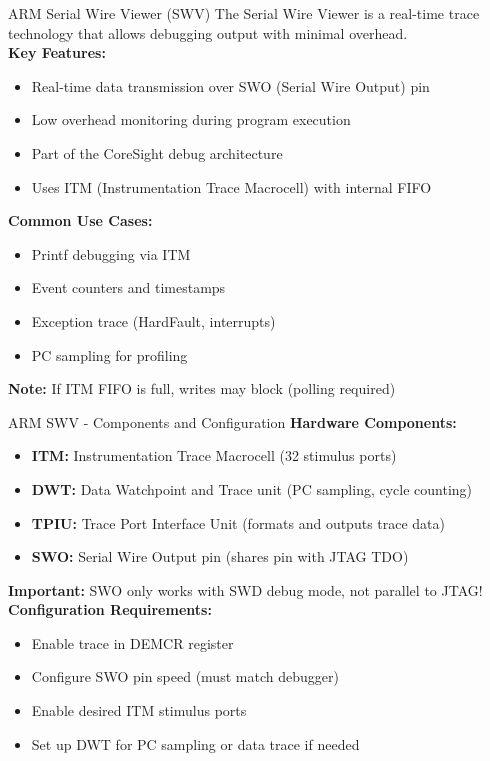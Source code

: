 \documentclass{beamer}
\begin{document}
\begin{frame}{ARM}
	{Serial Wire Viewer (SWV)}
	The Serial Wire Viewer is a real-time trace technology that allows debugging output with minimal overhead.\\
	\vspace{0.2cm}
	\textbf{Key Features:}
	\begin{itemize}
		\item Real-time data transmission over SWO (Serial Wire Output) pin
		\item Low overhead monitoring during program execution
		\item Part of the CoreSight debug architecture
		\item Uses ITM (Instrumentation Trace Macrocell) with internal FIFO
	\end{itemize}
	\vspace{0.2cm}
	\textbf{Common Use Cases:}
	\begin{itemize}
		\item Printf debugging via ITM
		\item Event counters and timestamps
		\item Exception trace (HardFault, interrupts)
		\item PC sampling for profiling
	\end{itemize}
	\vspace{0.2cm}
	\textbf{Note:} If ITM FIFO is full, writes may block (polling required)
\end{frame}

\begin{frame}{ARM}
	{SWV - Components and Configuration}
	\textbf{Hardware Components:}
	\begin{itemize}
		\item \textbf{ITM:} Instrumentation Trace Macrocell (32 stimulus ports)
		\item \textbf{DWT:} Data Watchpoint and Trace unit (PC sampling, cycle counting)
		\item \textbf{TPIU:} Trace Port Interface Unit (formats and outputs trace data)
		\item \textbf{SWO:} Serial Wire Output pin (shares pin with JTAG TDO)
	\end{itemize}
	\vspace{0.2cm}
	\textbf{Important:} SWO only works with SWD debug mode, not parallel to JTAG!
	\vspace{0.2cm}
	\textbf{Configuration Requirements:}
	\begin{itemize}
		\item Enable trace in DEMCR register
		\item Configure SWO pin speed (must match debugger)
		\item Enable desired ITM stimulus ports
		\item Set up DWT for PC sampling or data trace if needed
	\end{itemize}
\end{frame}
\end{document}

